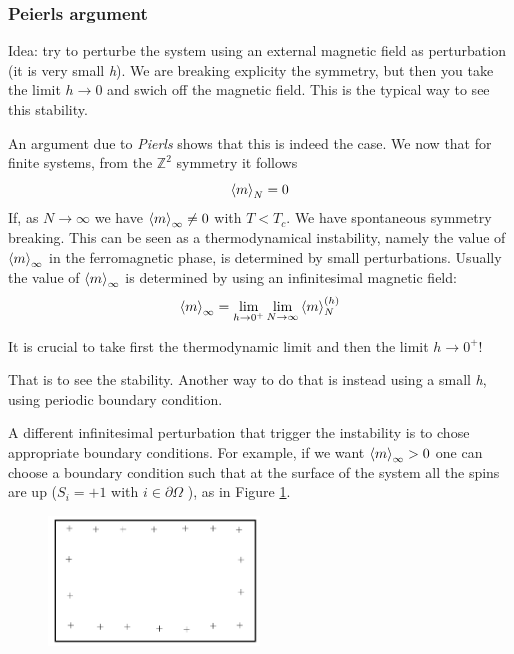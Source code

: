 \documentclass[../main/main.tex]{subfiles}
\begin{document}
\subsubsection{Peierls argument}
Idea: try to perturbe the system using an external magnetic field as perturbation (it is very small \emph{h}). We are breaking explicity the symmetry, but then you take the limit \( h \rightarrow 0 \) and swich off the magnetic field. This is the typical way to see this stability.

An argument due to \emph{Pierls} shows that this is indeed the case. We now that for finite systems, from the \( \mathbb{Z}^2 \) symmetry it follows
\begin{equation}
  \expval{m}_N = 0
\end{equation}
If, as \( N \rightarrow \infty  \) we have \( \expval{m}_{\infty } \neq 0  \) with \( T < T_c \). We have spontaneous symmetry breaking. This can be seen as a thermodynamical instability, namely the value of \( \expval{m}_ \infty   \) in the ferromagnetic phase, is determined by small perturbations. Usually the value of \( \expval{m}_ \infty   \)  is determined by using an infinitesimal magnetic field:
\begin{equation}
  \expval{m}_{\infty } = \lim_{h \rightarrow 0^+} \lim_{N \rightarrow \infty } \expval{m}_N^{(h)}
\end{equation}
\begin{remark}
It is crucial to take first the thermodynamic limit and then the limit \( h \rightarrow 0^+ \)!
\end{remark}
That is to see the stability.  Another way to do that is instead using a small \emph{h}, using periodic boundary condition.

A different infinitesimal perturbation that trigger the instability is to chose appropriate boundary conditions. For example, if we want \( \expval{m}_ \infty  > 0\) one can choose a boundary condition such that at the surface of the system all the spins are up (\( S_i = +1 \) with \( i \in \partial{\Omega }  \)  ), as in Figure \ref{fig:10_1}.

\begin{figure}[h!]
\centering
\includegraphics[width=0.5\textwidth]{../lessons/10_image/1.pdf}
\caption{\label{fig:10_1} }
\end{figure}
\end{document}
